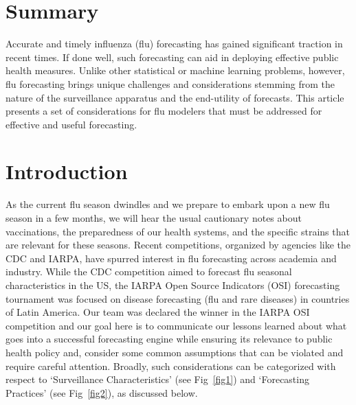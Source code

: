 \documentclass[10pt,letterpaper]{article}
\begin{document}
\section*{Summary}
Accurate and timely influenza (flu) forecasting has gained significant traction
in recent times. If done well, such forecasting can aid in deploying effective
public health measures. Unlike other statistical or machine learning problems,
however, flu forecasting brings unique challenges and considerations stemming
from the nature of the surveillance apparatus and the end-utility of forecasts.
This article presents a set of considerations for flu modelers that must be
addressed for effective and useful forecasting.



\linenumbers

\section*{Introduction}
As the current flu season dwindles and we prepare to embark upon a new flu
season in a few months, we will hear the usual cautionary notes about
vaccinations, the preparedness of our health systems, and the specific strains
that are relevant for these seasons.  Recent competitions, organized by
agencies like the CDC and IARPA, have spurred interest in flu forecasting
across academia and industry. While the CDC competition aimed to forecast flu
seasonal characteristics in the US, the IARPA Open Source Indicators (OSI)
forecasting tournament was focused on disease forecasting (flu and rare
diseases) in countries of Latin America. Our team was declared the winner in
the IARPA OSI competition and our goal here is to communicate our lessons
learned about what goes into a successful forecasting engine while ensuring its
relevance to public health policy and, consider some common assumptions that
can be violated and require careful attention. Broadly, such considerations 
can be categorized with respect to  `Surveillance Characteristics' 
(see Fig~\ref{fig1})
and `Forecasting Practices' (see Fig~\ref{fig2}), as discussed below.
\end{document}
